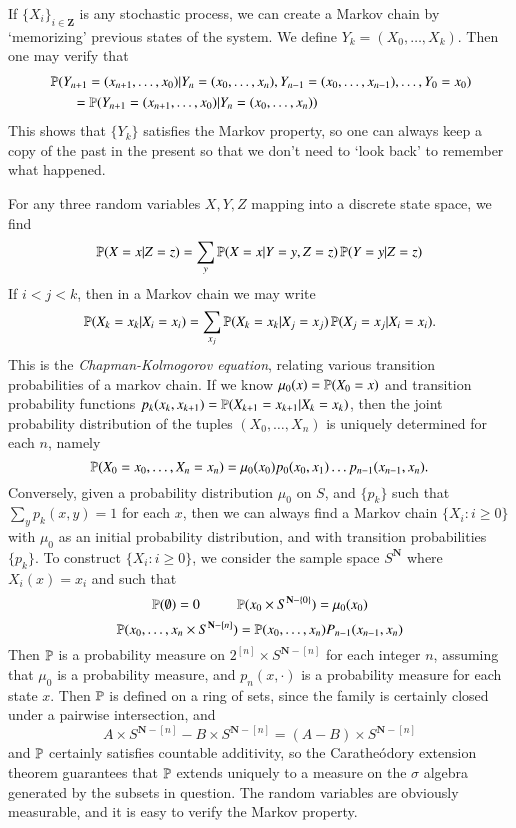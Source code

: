 \begin{example}
    If $\{X_i\}_{i \in \mathbf{Z}}$ is any stochastic process, we can create a Markov chain by `memorizing' previous states of the system. We define $Y_k = (X_0, \dots, X_k)$. Then one may verify that
    \begin{align*} &\operatorname{\mathbb{P}}(Y_{n+1} = (x_{n+1}, \dots, x_0) | Y_n = (x_0, \dots, x_n), Y_{n-1} = (x_0, \dots, x_{n-1}), \dots, Y_0 = x_0)\\
    &\ \ \ \ \ \ \ = \operatorname{\mathbb{P}}(Y_{n+1} = (x_{n+1}, \dots, x_0) | Y_n = (x_0, \dots, x_n)) \end{align*}
    This shows that $\{ Y_k \}$ satisfies the Markov property, so one can always keep a copy of the past in the present so that we don't need to `look back' to remember what happened.
\end{example}

For any three random variables $X,Y,Z$ mapping into a discrete state space, we find
%
\[ \operatorname{\mathbb{P}}(X = x | Z = z) = \sum_y \operatorname{\mathbb{P}}(X = x | Y = y, Z = z) \operatorname{\mathbb{P}}(Y = y| Z = z) \]
%
If $i < j < k$, then in a Markov chain we may write
%
\[ \operatorname{\mathbb{P}}(X_k = x_k | X_i = x_i) = \sum_{x_j} \operatorname{\mathbb{P}}(X_k = x_k | X_j = x_j) \operatorname{\mathbb{P}}(X_j = x_j | X_i = x_i). \]
%
This is the \emph{Chapman-Kolmogorov equation}, relating various transition probabilities of a markov chain. If we know $\mu_0(x) = \operatorname{\mathbb{P}}(X_0 = x)$ and transition probability functions $p_k(x_k,x_{k+1}) = \operatorname{\mathbb{P}}(X_{k+1} = x_{k+1} | X_k = x_k)$, then the joint probability distribution of the tuples $(X_0,\dots,X_n)$ is uniquely determined for each $n$, namely
%
\[ \operatorname{\mathbb{P}}(X_0 = x_0, \dots, X_n = x_n) = \mu_0(x_0) p_0(x_0,x_1) \dots p_{n-1}(x_{n-1}, x_n). \]
%
Conversely, given a probability distribution $\mu_0$ on $S$, and $\{ p_k \}$ such that $\sum_y p_k(x,y) = 1$ for each $x$, then we can always find a Markov chain $\{ X_i : i \geq 0 \}$ with $\mu_0$ as an initial probability distribution, and with transition probabilities $\{ p_k \}$. To construct $\{ X_i : i \geq 0 \}$, we consider the sample space $S^{\mathbf{N}}$ where $X_i(x) = x_i$ and such that
%
\[ \PP(\emptyset) = 0\ \ \ \ \ \ \ \ \ \ \PP(x_0 \times S^{\mathbf{N} - \{ 0 \}}) = \mu_0(x_0) \]
\[ \operatorname{\mathbb{P}}(x_0, \dots, x_n \times S^{\mathbf{N} - [n]}) = \operatorname{\mathbb{P}}(x_0, \dots, x_n) P_{n-1}(x_{n-1},x_n) \]
%
Then $\operatorname{\mathbb{P}}$ is a probability measure on $2^{[n]} \times S^{\mathbf{N} - [n]}$ for each integer $n$, assuming that $\mu_0$ is a probability measure, and $p_n(x,\cdot)$ is a probability measure for each state $x$. Then $\operatorname{\mathbb{P}}$ is defined on a ring of sets, since the family is certainly closed under a pairwise intersection, and
%
\[ A \times S^{\mathbf{N}-[n]} - B \times S^{\mathbf{N}-[n]} = (A - B) \times S^{\mathbf{N}-[n]} \]
%
and $\operatorname{\mathbb{P}}$ certainly satisfies countable additivity, so the Carathe\'{o}dory extension theorem guarantees that $\operatorname{\mathbb{P}}$ extends uniquely to a measure on the $\sigma$ algebra generated by the subsets in question. The random variables are obviously measurable, and it is easy to verify the Markov property.


